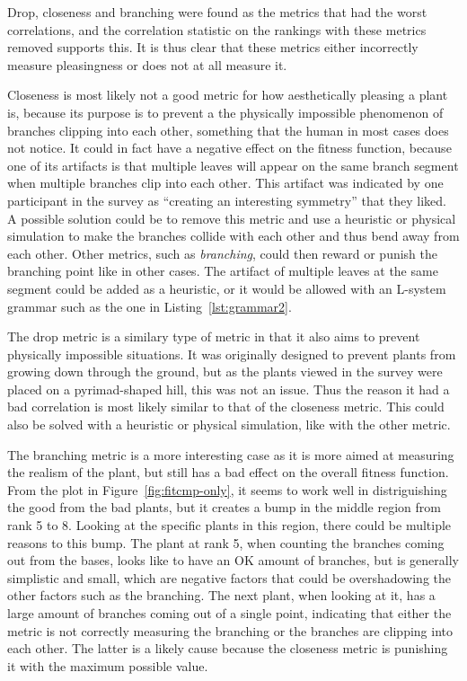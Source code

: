Drop, closeness and branching were found as the metrics that had the worst correlations, and the correlation statistic on the rankings with these metrics removed supports this.
It is thus clear that these metrics either incorrectly measure pleasingness or does not at all measure it.

Closeness is most likely not a good metric for how aesthetically pleasing a plant is, because its purpose is to prevent a the physically impossible phenomenon of branches clipping into each other, something that the human in most cases does not notice.
It could in fact have a negative effect on the fitness function, because one of its artifacts is that multiple leaves will appear on the same branch segment when multiple branches clip into each other.
This artifact was indicated by one participant in the survey as ``creating an interesting symmetry'' that they liked.
A possible solution could be to remove this metric and use a heuristic or physical simulation to make the branches collide with each other and thus bend away from each other.
Other metrics, such as \textit{branching}, could then reward or punish the branching point like in other cases.
The artifact of multiple leaves at the same segment could be added as a heuristic, or it would be allowed with an L-system grammar such as the one in Listing~\ref{lst:grammar2}.

The drop metric is a similary type of metric in that it also aims to prevent physically impossible situations.
It was originally designed to prevent plants from growing down through the ground, but as the plants viewed in the survey were placed on a pyrimad-shaped hill, this was not an issue.
Thus the reason it had a bad correlation is most likely similar to that of the closeness metric.
This could also be solved with a heuristic or physical simulation, like with the other metric.

The branching metric is a more interesting case as it is more aimed at measuring the realism of the plant, but still has a bad effect on the overall fitness function.
From the plot in Figure~\ref{fig:fitcmp-only}, it seems to work well in distriguishing the good from the bad plants, but it creates a bump in the middle region from rank 5 to 8.
Looking at the specific plants in this region, there could be multiple reasons to this bump.
The plant at rank 5, when counting the branches coming out from the bases, looks like to have an OK amount of branches, but is generally simplistic and small, which are negative factors that could be overshadowing the other factors such as the branching.
The next plant, when looking at it, has a large amount of branches coming out of a single point, indicating that either the metric is not correctly measuring the branching or the branches are clipping into each other.
The latter is a likely cause because the closeness metric is punishing it with the maximum possible value.

